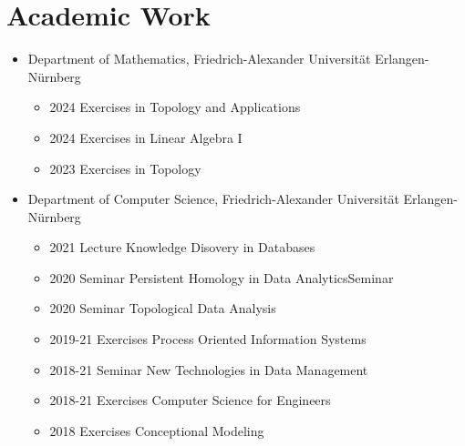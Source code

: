 \documentclass[a4paper,11pt]{article}
\newcommand{\years}[1]{\marginnote{\scriptsize #1}}
\begin{document}
\section*{Academic Work}
\years{Teaching}
\vspace{-2pt}
\begin{itemize}[noitemsep, leftmargin=*]
    \item Department of Mathematics, Friedrich-Alexander Universität Erlangen-Nürnberg
          \begin{itemize}
            \item 2024 Exercises in Topology and Applications
            \item 2024 Exercises in Linear Algebra I
            \item 2023 Exercises in Topology
          \end{itemize}
    \item Department of Computer Science, Friedrich-Alexander Universität Erlangen-Nürnberg
          \begin{itemize}
            \item 2021 Lecture Knowledge Disovery in Databases
            \item 2020 Seminar Persistent Homology in Data AnalyticsSeminar 
            \item 2020 Seminar Topological Data Analysis
            \item 2019-21 Exercises Process Oriented Information Systems
            \item 2018-21 Seminar New Technologies in Data Management
            \item 2018-21 Exercises Computer Science for Engineers
            \item 2018 Exercises Conceptional Modeling
          \end{itemize}
\end{itemize}
\vspace{10pt}
\end{document}
